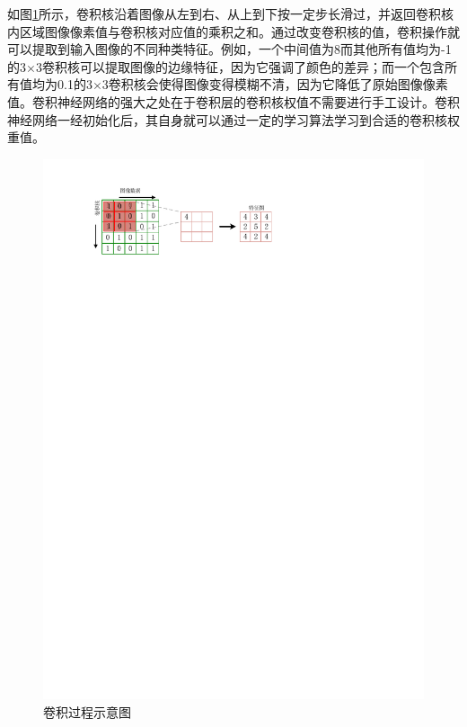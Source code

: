 如图\ref{figure:figure3}所示，卷积核沿着图像从左到右、从上到下按一定步长滑过，并返回卷积核内区域图像像素值与卷积核对应值的乘积之和。通过改变卷积核的值，卷积操作就可以提取到输入图像的不同种类特征。例如，一个中间值为8而其他所有值均为-1的3$\times$3卷积核可以提取图像的边缘特征，因为它强调了颜色的差异；而一个包含所有值均为0.1的3$\times$3卷积核会使得图像变得模糊不清，因为它降低了原始图像像素值。卷积神经网络的强大之处在于卷积层的卷积核权值不需要进行手工设计。卷积神经网络一经初始化后，其自身就可以通过一定的学习算法学习到合适的卷积核权重值。

\begin{figure}[htbp]
    \begin{center}
    \includegraphics{figures/conv_process.pdf}
    \caption{卷积过程示意图}\label{figure:figure3}
    \end{center}
\end{figure}

